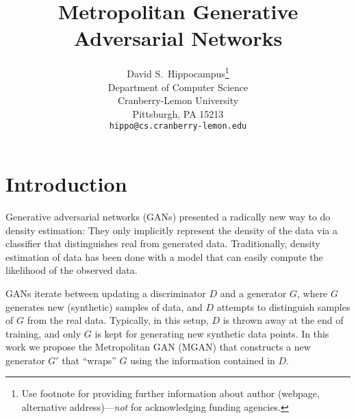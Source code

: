 \documentclass{article}
\title{Metropolitan Generative Adversarial Networks}
\author{
  David S.~Hippocampus\thanks{Use footnote for providing further
    information about author (webpage, alternative
    address)---\emph{not} for acknowledging funding agencies.} \\
  Department of Computer Science\\
  Cranberry-Lemon University\\
  Pittsburgh, PA 15213 \\
  \texttt{hippo@cs.cranberry-lemon.edu} \\
}
\begin{document}

\maketitle


\section{Introduction}

Generative adversarial networks (GANs) presented a radically new way to do density estimation:
They only implicitly represent the density of the data via a classifier that distinguishes real from generated data.
Traditionally, density estimation of data has been done with a model that can easily compute the likelihood of the observed data.

GANs iterate between updating a discriminator $D$ and a generator $G$, where $G$ generates new (synthetic) samples of data, and $D$ attempts to distinguish samples of $G$ from the real data.
Typically, in this setup, $D$ is thrown away at the end of training, and only $G$ is kept for generating new synthetic data points.
In this work we propose the Metropolitan GAN (MGAN) that constructs a new generator $G'$ that ``wraps'' $G$ using the information contained in $D$.

\end{document}
